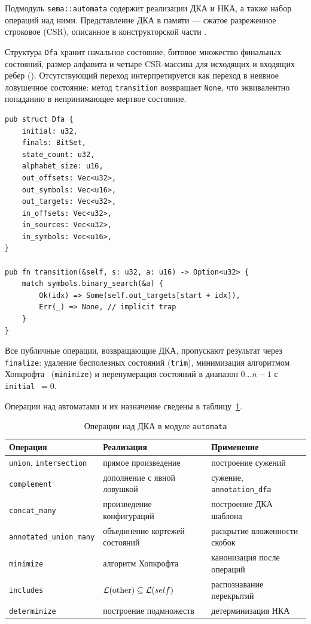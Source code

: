 Подмодуль \texttt{sema::automata} содержит реализации ДКА и НКА, а также набор операций над ними.
Представление ДКА в памяти --- сжатое разреженное строковое (CSR), описанное в конструкторской части .

Структура \texttt{Dfa} хранит начальное состояние, битовое множество финальных состояний, размер алфавита и четыре CSR-массива для исходящих и входящих ребер ().
Отсутствующий переход интерпретируется как переход в неявное ловушечное состояние: метод \texttt{transition} возвращает \texttt{None}, что эквивалентно попаданию в непринимающее мертвое состояние.

\begin{listing}[H]
\caption{Структура ДКА и метод перехода}
\label{lst:dfa-struct}
\begin{verbatim}
pub struct Dfa {
    initial: u32,
    finals: BitSet,
    state_count: u32,
    alphabet_size: u16,
    out_offsets: Vec<u32>,
    out_symbols: Vec<u16>,
    out_targets: Vec<u32>,
    in_offsets: Vec<u32>,
    in_sources: Vec<u32>,
    in_symbols: Vec<u16>,
}

pub fn transition(&self, s: u32, a: u16) -> Option<u32> {
    match symbols.binary_search(&a) {
        Ok(idx) => Some(self.out_targets[start + idx]),
        Err(_) => None, // implicit trap
    }
}
\end{verbatim}
\end{listing}

Все публичные операции, возвращающие ДКА, пропускают результат через \texttt{finalize}: удаление бесполезных состояний (\texttt{trim}), минимизация алгоритмом Хопкрофта~\cite{hopcroft2006automata} (\texttt{minimize}) и перенумерация состояний в диапазон $0 \ldots n-1$ с \texttt{initial}~$= 0$.

Операции над автоматами и их назначение сведены в таблицу~\ref{tab:dfa-ops}.

\begin{table}[htbp]
\centering
\caption{Операции над ДКА в модуле \texttt{automata}}
\label{tab:dfa-ops}
\small
\begin{tabular}{@{}p{4.7cm}p{4.5cm}p{5.5cm}@{}}
\toprule
Операция & Реализация & Применение \\
\midrule
\texttt{union}, \texttt{intersection} & прямое произведение & построение сужений \\
\texttt{complement} & дополнение с явной ловушкой & сужение, \texttt{annotation\_dfa} \\
\texttt{concat\_many} & произведение конфигураций & построение ДКА шаблона \\
\texttt{annotated\_union\_many} & объединение кортежей состояний & раскрытие вложенности скобок \\
\texttt{minimize} & алгоритм Хопкрофта & канонизация после операций \\
\texttt{includes} & $\mathcal{L}(\text{other}) \subseteq \mathcal{L}(self)$ & распознавание перекрытий \\
\texttt{determinize} & построение подмножеств & детерминизация НКА \\
\bottomrule
\end{tabular}
\end{table}

